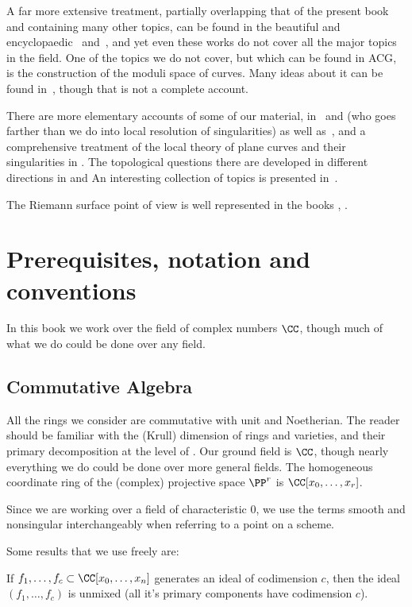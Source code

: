 A far more extensive treatment, partially overlapping that of the present book and containing many other topics, can be found in the beautiful and encyclopaedic~\cite{ACGH} and~\cite{ACG}, and yet even these works do not cover all the major topics in the field. 
One of the topics we do not cover, but which can be found in {ACG}, is the construction of the moduli space of curves. Many  ideas  about it can be found in~\cite{HarrisMorrison1998}, though  that is not a complete account. 

There are more elementary accounts of some of our material, in~\cite{Fulton1989} and \cite{Walker1978} (who goes farther than we do into local resolution of singularities) as well as~\cite{Griffiths-curves}, and a comprehensive treatment of the local theory of plane curves and their singularities in \cite{Brieskorn1986}. The topological questions there are developed in different directions in \cite{MR0239612} %
 and \cite{MR817982}%
 An interesting collection of topics is presented in~\cite{Clemens-Scrapbook}.

 The Riemann surface point of view is well represented in the books \cite{Forster} \cite{Gunning}, \cite{Gunning-2} \cite{Kirwan}\cite{Miranda}. 


\section{Prerequisites, notation and conventions}

In this book we work over the field of complex numbers $\CC$, though much of what we do
could be done over any field. 

\subsection{Commutative Algebra} 
All the rings we consider are commutative with unit and Noetherian.
The reader should be familiar with the (Krull) dimension of rings and varieties, and their primary decomposition at the level of \cite{Atiyah-MacDonald}. Our ground field is $\CC$, though nearly everything we do could be done over more general fields. The homogeneous coordinate ring of the (complex) projective space $\PP^r$ is $\CC[x_0, \dots, x_r]$. 

Since we are working over  a field of characteristic 0, we use the terms smooth and nonsingular interchangeably when
referring to a point on a scheme.

Some results that we use freely are:
 \begin{theorem}\label{Lasker}
If $f_1,\dots, f_c \subset \CC[x_0,\dots, x_n]$ generates an ideal of codimension $c$, then 
the ideal $(f_1,\dots, f_c)$ is unmixed (all it's primary components have codimension $c$).
\end{theorem}

